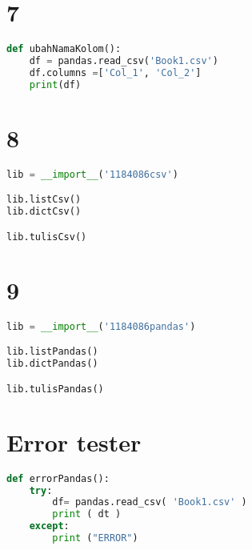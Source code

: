 \section*{7}
\begin{lstlisting}[language=Python]
def ubahNamaKolom():
    df = pandas.read_csv('Book1.csv')
    df.columns =['Col_1', 'Col_2'] 
    print(df)

\end{lstlisting}
\section*{8}
\begin{lstlisting}[language=Python]
lib = __import__('1184086csv')

lib.listCsv()
lib.dictCsv()

lib.tulisCsv()
\end{lstlisting}
\section*{9}
\begin{lstlisting}[language=Python]
lib = __import__('1184086pandas')

lib.listPandas()
lib.dictPandas()

lib.tulisPandas()
\end{lstlisting}

\section*{Error tester}
\begin{lstlisting}[language=Python]
def errorPandas(): 
    try:
        df= pandas.read_csv( 'Book1.csv' ) 
        print ( dt ) 
    except: 
        print ("ERROR")
\end{lstlisting}